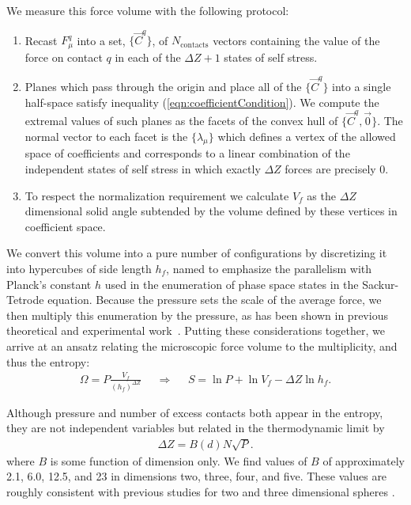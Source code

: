 We measure this force volume with the following protocol:
\begin{enumerate}
\item Recast $F_\mu^q$ into a set, $\{\vec{C}^q\}$, of $N_{\textrm{contacts}}$ vectors containing the value of the force on contact $q$ in each of the $\Delta Z+1$ states of self stress.
\item Planes which pass through the origin and place all of the $\{\vec{C}^q\}$ into a single half-space satisfy inequality (\ref{eqn:coefficientCondition}).  We compute the extremal values of such planes as the facets of the convex hull \cite{barber_quickhull_1996} of $\{\vec{C}^q, \vec{0}\}$.  The normal vector to each facet is the $\{\lambda_\mu \}$ which defines a vertex of the allowed space of coefficients and corresponds to a linear combination of the independent states of self stress in which exactly $\Delta Z$ forces are precisely 0.
\item To respect the normalization requirement we calculate $V_f$ as the $\Delta Z$ dimensional solid angle subtended by the volume defined by these vertices in coefficient space.
\end{enumerate}

We convert this volume into a pure number of configurations by discretizing it into hypercubes of side length $h_f$, named to emphasize the parallelism with Planck's constant $h$ used in the enumeration of phase space states in the Sackur-Tetrode equation.
Because the pressure sets the scale of the average force, we then multiply this enumeration by the pressure, as has been shown in previous theoretical and experimental work~\cite{henkes_statistical_2009,bililign_protocol_2019,mailman_using_2012}. Putting these considerations together, we arrive at an ansatz relating the microscopic force volume to the multiplicity, and thus the entropy:
%
\begin{align}
\Omega = P \frac{V_f}{(h_f)^{\Delta Z}} && \Longrightarrow && S=\ln P  + \ln{V_f} - \Delta Z \ln{h_f}.
\label{eqn:entropy}
\end{align}

Although pressure and number of excess contacts both appear in the entropy, they are not independent variables but related in the thermodynamic limit by~\cite{ohern_jamming_2003,goodrich_scaling_2016}
%
\begin{align}
\label{eqn:excess}
 \Delta Z = B(d) N \sqrt{P}.
\end{align}
%
where $B$ is some function of dimension only. We find values of $B$ of approximately 2.1, 6.0, 12.5, and 23 in dimensions two, three, four, and five. These values are roughly consistent with previous studies for two and three dimensional spheres \cite{ohern_jamming_2003, goodrich_finite-size_2012}. 

